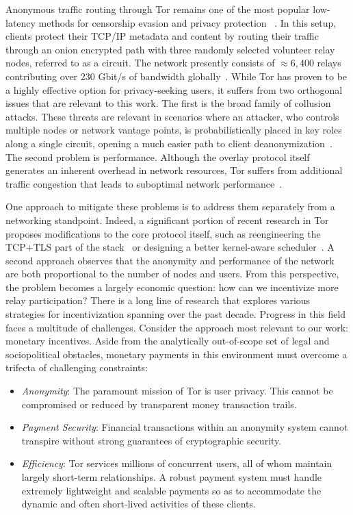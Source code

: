 Anonymous traffic routing through Tor remains one of the most popular
low-latency methods for censorship evasion and privacy protection
~\cite{dingledine2004tor}. In this setup, clients protect their TCP/IP metadata
and content by routing their traffic through an onion encrypted path with three
randomly selected volunteer relay nodes, referred to as a circuit. The network
presently consists of $\approx 6,400$ relays contributing over 230 Gbit/s of
bandwidth globally~\cite{portal2018tormetrics}. While Tor has proven to be a
highly effective option for privacy-seeking users, it suffers from two
orthogonal issues that are relevant to this work. The first is the broad family
of collusion attacks. These threats are relevant in scenarios where an attacker,
who controls multiple nodes or network vantage points, is probabilistically
placed in key roles along a single circuit, opening a much easier path to client
deanonymization~\cite{wright2004predecessor,murdoch2005low}. The second problem
is performance. Although the overlay protocol itself generates an inherent
overhead in network resources, Tor suffers from additional traffic congestion
that leads to suboptimal network performance~\cite{portal2018tormetrics,
  alsabah2016performance}.

One approach to mitigate these problems is to address them separately from a
networking standpoint. Indeed, a significant portion of recent research in Tor
proposes modifications to the core protocol itself, such as reengineering the
TCP+TLS part of the stack~\cite{reardon2009improving} or designing a better
kernel-aware scheduler~\cite{jansen2014never}. A second approach observes that
the anonymity and performance of the network are both proportional to the number
of nodes and users. From this perspective, the problem becomes a largely
economic question: how can we incentivize more relay participation? There is a
long line of research that explores various strategies for incentivization
spanning over the past decade. Progress in this field faces a multitude of
challenges. Consider the approach most relevant to our work: monetary
incentives. Aside from the analytically out-of-scope set of legal and
sociopolitical obstacles, monetary payments in this environment must overcome a
trifecta of challenging constraints:

\begin{itemize}
\item \emph{Anonymity}: The paramount mission of Tor is user privacy. This
  cannot be compromised or reduced by transparent money transaction trails.
\item \emph{Payment Security}: Financial transactions within an anonymity system cannot transpire
  without strong guarantees of cryptographic security.
\item \emph{Efficiency}: Tor services millions of concurrent users, all of whom
  maintain largely short-term relationships. A robust payment system must handle
  extremely lightweight and scalable payments so as to accommodate the dynamic
  and often short-lived activities of these clients.
\end{itemize}

